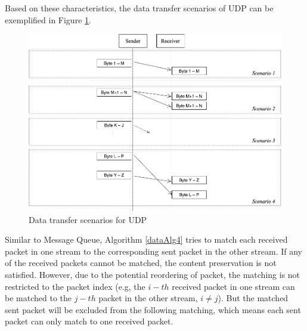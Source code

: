 Based on these characteristics, the data transfer scenarios of UDP can be exemplified in Figure \ref{upd}.
\begin{figure}[H]
\centerline{\includegraphics[scale=0.4]{Figures/udp}}
 \caption{Data transfer scenarios for UDP}
\label{upd}
\end{figure}

Similar to Message Queue, Algorithm \ref{dataAlg4} tries to match each received packet in one stream to the corresponding sent packet in the other stream. If any of the received packets cannot be matched, the content preservation is not satisfied. However, due to the potential reordering of packet, the matching is not restricted to the packet index (e.g, the $i-th$ received packet in one stream can be matched to the $j-th$ packet in the other stream, $i \neq j$). But the matched sent packet will be excluded from the following matching, which means each sent packet can only match to one received packet.

